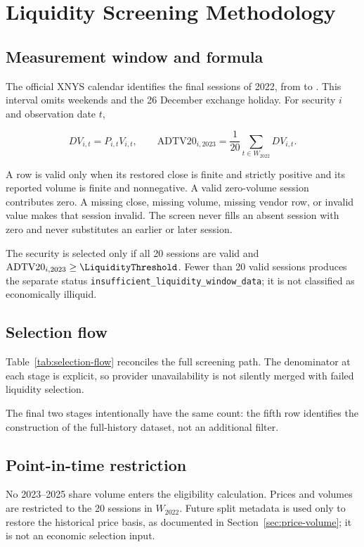 \section{Liquidity Screening Methodology}

\subsection{Measurement window and formula}

The official XNYS calendar \citep{excal,nyse} identifies the final
\LiquidityWindowSessions{}
sessions of 2022, from \LiquidityWindowStart{} to \LiquidityWindowEnd{}. This
interval omits weekends and the 26 December exchange holiday. For security
\(i\) and observation date \(t\),

\begin{equation}
DV_{i,t}=P_{i,t}V_{i,t},
\qquad
\mathrm{ADTV20}_{i,2023}=\frac{1}{20}\sum_{t\in W_{2022}}DV_{i,t}.
\end{equation}

A row is valid only when its restored close is finite and strictly positive and
its reported volume is finite and nonnegative. A valid zero-volume session
contributes zero. A missing close, missing volume, missing vendor row, or
invalid value makes that session invalid. The screen never fills an absent
session with zero and never substitutes an earlier or later session.

The security is selected only if all 20 sessions are valid and
\(\mathrm{ADTV20}_{i,2023}\geq\LiquidityThreshold\). Fewer than 20 valid
sessions produces the separate status
\texttt{insufficient\_liquidity\_window\_data}; it is not classified as
economically illiquid.

\subsection{Selection flow}

Table~\ref{tab:selection-flow} reconciles the full screening path. The
denominator at each stage is explicit, so provider unavailability is not
silently merged with failed liquidity selection.

\begin{table}[tbp]
\centering
\caption{Fixed 2023 liquidity selection flow}
\label{tab:selection-flow}
\begin{tablenotes}\small
\item The final two stages intentionally have the same count: the fifth row
identifies the construction of the full-history dataset, not an additional
filter.
\end{tablenotes}
\end{table}

\subsection{Point-in-time restriction}

No 2023--2025 share volume enters the eligibility calculation. Prices and
volumes are restricted to the 20 sessions in \(W_{2022}\). Future split
metadata is used only to restore the historical price basis, as documented in
Section~\ref{sec:price-volume}; it is not an economic selection input.
